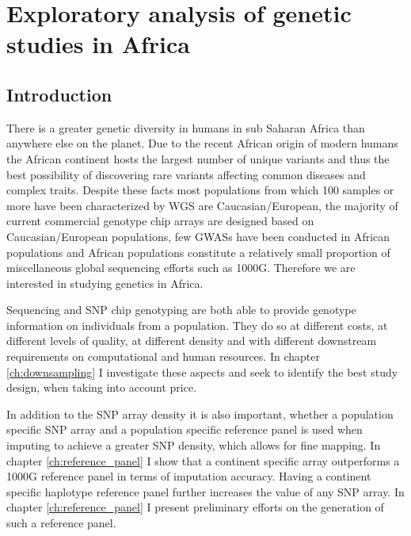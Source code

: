 \chapter{Exploratory analysis of genetic studies in Africa}

\section{Introduction}

There is a greater genetic diversity in humans in sub Saharan Africa than anywhere else on the planet.\cite{Bowcock1994}\cite{Jorde1995}\cite{Tishkoff08031996}\cite{Jorde2000}\cite{Stephens2001}\cite{Tishkoff2002}\cite{Stringer2003}\cite{Tishkoff2004}\cite{HapMap2005}\cite{Ramachandran01112005}\cite{Tishkoff22052009}\cite{1000G2010}\cite{1000G2012}\cite{Gurdasani2015}
Due to the recent African origin of modern humans the African continent hosts the largest number of unique variants and thus the best possibility of discovering rare variants affecting common diseases and complex traits.
Despite these facts most populations from which 100 samples or more have been characterized by \gls{WGS} are Caucasian/European, the majority of current commercial genotype chip arrays are designed based on Caucasian/European populations, few \glspl{GWAS} have been conducted in African populations and African populations constitute a relatively small proportion of miscellaneous global sequencing efforts such as 1000G.\cite{1000G2012}
Therefore we are interested in studying genetics in Africa.

Sequencing and \gls{SNP} chip genotyping are both able to provide genotype information on individuals from a population. They do so at different costs, at different levels of quality, at different density and with different downstream requirements on computational and human resources. In chapter \ref{ch:downsampling} I investigate these aspects and seek to identify the best study design, when taking into account price.

In addition to the \gls{SNP} array density it is also important, whether a population specific \gls{SNP} array and a population specific reference panel is used when imputing to achieve a greater SNP density, which allows for fine mapping. In chapter \ref{ch:reference_panel} I show that a continent specific array outperforms a 1000G reference panel in terms of imputation accuracy. Having a continent specific haplotype reference panel further increases the value of any SNP array. In chapter \ref{ch:reference_panel} I present preliminary efforts on the generation of such a reference panel.

